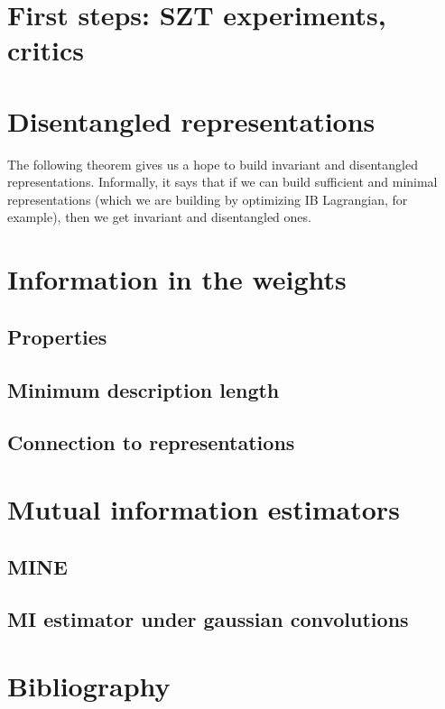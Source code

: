 \documentclass{article}
\begin{document}
\section{First steps: SZT experiments, critics}

\section{Disentangled representations}

The following theorem gives us a hope to build invariant and disentangled representations.
Informally, it says that if we can build sufficient and minimal representations (which we are building by optimizing IB Lagrangian, for example), then we get invariant and disentangled ones.

\section{Information in the weights}
\subsection{Properties}
\subsection{Minimum description length}
\subsection{Connection to representations}

\section{Mutual information estimators}
\subsection{MINE}

\subsection{MI estimator under gaussian convolutions}

\section{Bibliography}
\printbibliography
\end{document}
